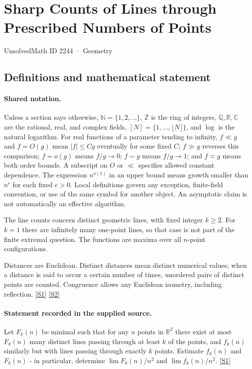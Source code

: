 \documentclass[11pt,a4paper]{article}
\newcommand{\N}{\mathbb{N}}
\newcommand{\Z}{\mathbb{Z}}
\newcommand{\Q}{\mathbb{Q}}
\newcommand{\R}{\mathbb{R}}
\newcommand{\C}{\mathbb{C}}
\newcommand{\sref}[2]{\hyperlink{source:#1:#2}{[S#2]}}
\begin{document}

\setcounter{section}{2243}

\section{Sharp Counts of Lines through Prescribed Numbers of Points}\label{2244}

{\small\sffamily UnsolvedMath ID 2244 · Geometry}

\subsection{Definitions and mathematical statement}

\paragraph{Shared notation.}Unless a section says otherwise, $\N=\{1,2,\ldots\}$,
$\Z$ is the ring of integers, $\Q,\R,\C$ are the rational, real, and complex
fields, $[N]=\{1,\ldots,\lfloor N\rfloor\}$, and $\log$ is the natural
logarithm. For real functions of a parameter tending to infinity,
$f\ll g$ and $f=O(g)$ mean $|f|\leq Cg$ eventually for some fixed $C$;
$f\gg g$ reverses this comparison; $f=o(g)$ means $f/g\to0$;
$f\sim g$ means $f/g\to1$; and $f\asymp g$ means both order bounds.
A subscript on $O$ or $\ll$ specifies allowed constant dependence.
The expression $n^{o(1)}$ in an upper bound means growth smaller than
$n^\epsilon$ for each fixed $\epsilon>0$. Local definitions govern any
exception, finite-field convention, or use of the same symbol for another
object. An asymptotic claim is not automatically an effective algorithm.



The line counts concern distinct geometric lines, with fixed integer $k\geq2$. For $k=1$ there are infinitely many one-point lines, so that case is not part of the finite extremal question. The functions are maxima over all $n$-point configurations.

Distances are Euclidean. Distinct distances mean distinct numerical values; when a distance is said to occur a certain number of times, unordered pairs of distinct points are counted. Congruence allows any Euclidean isometry, including reflection. \sref{2244}{1} \sref{2244}{2}

\paragraph{Statement recorded in the supplied source.}
Let $F_k(n)$ be minimal such that for any $n$ points in $\mathbb{R}^2$ there exist at most $F_k(n)$ many distinct lines passing through at least $k$ of the points, and $f_k(n)$ similarly but with lines passing through exactly $k$ points.
Estimate $f_k(n)$ and $F_k(n)$ - in particular, determine $\lim F_k(n)/n^2$ and $\lim f_k(n)/n^2$. \sref{2244}{1}
\end{document}
